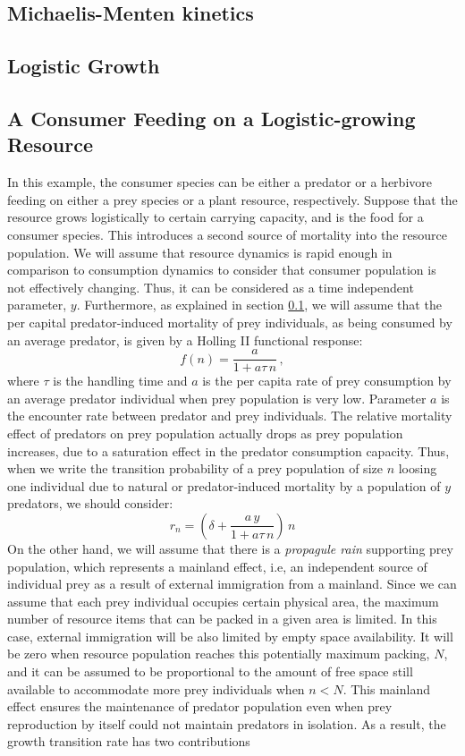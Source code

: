 \documentclass{article}
\begin{document}
\subsection{Michaelis-Menten kinetics}
\label{MMkin}


\subsection{Logistic Growth}


\subsection{A Consumer Feeding on a Logistic-growing Resource}
In this example, the consumer species can be either a predator or a herbivore feeding on either a prey species or a plant resource, respectively. Suppose that the resource grows logistically to certain carrying capacity, and is the food for a consumer species. This introduces a second source of mortality into the resource population. We will assume that resource dynamics is rapid enough in comparison to consumption dynamics to consider that consumer population is not effectively changing. Thus, it can be considered as a time independent parameter, $y$. Furthermore, as explained in section \ref{MMkin}, we will assume that the per capital predator-induced mortality of prey individuals, as being consumed by an average predator, is given by a Holling II functional response:
\begin{equation}
f(n) = \frac{a}{1+a\tau\,n}\,,
\end{equation}
where $\tau$ is the handling time and $a$ is the per capita rate of prey consumption by an average predator individual when prey population is very low. Parameter $a$ is the encounter rate between predator and prey individuals. The relative mortality effect of predators on prey population actually drops as prey population increases, due to a saturation effect in the predator consumption capacity. Thus, when we write the transition probability of a prey population of size $n$ loosing one individual due to natural or predator-induced mortality by a population of $y$ predators, we should consider:
\begin{equation}
\label{r_2}
r_{n}  =  \left(\delta + \frac{a\,y}{1+a\tau\,n}\right)\,n 
\end{equation}
On the other hand, we will assume that there is a {\em  propagule rain} \citep{Gotelli93} supporting prey population, which represents a mainland effect, i.e, an independent source of individual prey as a result of external immigration from a mainland. Since we can assume that each prey individual occupies certain physical area, the maximum number of resource items that can be packed in a given area is limited. In this case, external immigration will be also limited by empty space availability. It will be zero when resource population reaches this potentially maximum packing, $N$, and it can be assumed to be proportional to the amount of free space still available to accommodate more prey individuals when $n < N$. This mainland effect ensures the maintenance of predator population even when prey reproduction by itself could not maintain predators in isolation. As a result, the growth transition rate has two contributions
\end{document}
